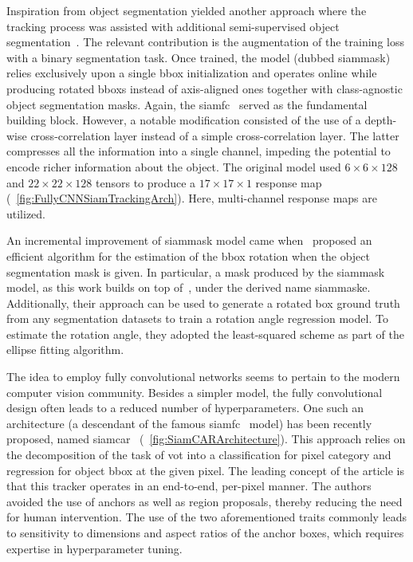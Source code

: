 Inspiration from object segmentation yielded another approach where the tracking process was assisted with additional semi-supervised object segmentation~\cite{wang2019siammask}. The relevant contribution is the augmentation of the training loss with a binary segmentation task. Once trained, the model (dubbed \gls{siammask}) relies exclusively upon a single \gls{bbox} initialization and operates online while producing rotated \glspl{bbox} instead of axis-aligned ones together with class-agnostic object segmentation masks. Again, the \gls{siamfc}~\cite{bertinetto2016siamfc} served as the fundamental building block. However, a notable modification consisted of the use of a depth-wise cross-correlation layer instead of a simple cross-correlation layer. The latter compresses all the information into a single channel, impeding the potential to encode richer information about the object. The original model used $6 \times 6 \times 128$ and $22 \times 22 \times 128$ tensors to produce a $17 \times 17 \times 1$ response map (\figtext{}~\ref{fig:FullyCNNSiamTrackingArch}). Here, multi-channel response maps are utilized.

An incremental improvement of \gls{siammask} model came when~\cite{chen2019rotbboxes} proposed an efficient algorithm for the estimation of the \gls{bbox} rotation when the object segmentation mask is given. In particular, a mask produced by the \gls{siammask} model, as this work builds on top of~\cite{wang2019siammask}, under the derived name \gls{siammaske}. Additionally, their approach can be used to generate a rotated box ground truth from any segmentation datasets to train a rotation angle regression model. To estimate the rotation angle, they adopted the least-squared scheme as part of the ellipse fitting algorithm.

The idea to employ fully convolutional networks seems to pertain to the modern computer vision community. Besides a simpler model, the fully convolutional design often leads to a reduced number of hyperparameters. One such an architecture (a descendant of the famous \gls{siamfc}~\cite{bertinetto2016siamfc} model) has been recently proposed, named \gls{siamcar}~\cite{guo2019siamcar} (\figtext{}~\ref{fig:SiamCARArchitecture}). This approach relies on the decomposition of the task of \gls{vot} into a classification for pixel category and regression for object \gls{bbox} at the given pixel. The leading concept of the article is that this tracker operates in an end-to-end, per-pixel manner. The authors avoided the use of anchors as well as region proposals, thereby reducing the need for human intervention. The use of the two aforementioned traits commonly leads to sensitivity to dimensions and aspect ratios of the anchor boxes, which requires expertise in hyperparameter tuning.

